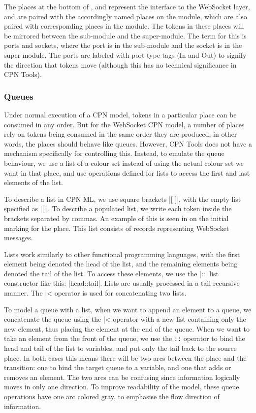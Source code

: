 	The places at the bottom of ,  and
	  represent the interface to the WebSocket layer, and
	are paired with the accordingly named places on the  module,
	which are also paired with corresponding places in the  module. The tokens in these places will be mirrored between the
	sub-module and the super-module. The term for this is ports and sockets,
	where the port is in the sub-module and the socket is in the super-module. The
	ports are labeled with port-type tags (In and Out) to signify the direction
	that tokens move (although this has no technical significance in CPN Tools).
	
	
	\subsubsection{Queues}
	
		Under normal execution of a CPN model, tokens in a particular place can be
		consumed in any order. But for the WebSocket CPN model, a number of places
		rely on tokens being consumed in the same order they are produced,
		in other words, the places should behave like queues. 
		However, CPN Tools does not have a mechanism specifically for controlling
		this.
		Instead, to emulate the queue behaviour, we use a list of a colour set
		instead of using the actual colour set we want in that place, and use
		operations defined for lists to access the first and last elements of the
		list. 
		
		To describe a list in CPN ML, we use square brackets |[ ]|, with the empty
		list specified as |[]|. To describe a populated list, we write each token
		inside the brackets separated by commas. An example of this is seen in
		 on the initial marking for the 
		place. This list consists of records representing WebSocket messages.
		
		Lists work similarly to other functional programming languages, with the
		first element being denoted the head of the list, and the remaining elements
		being denoted the tail of the list. To access these elements, we use the |::|
		list constructor like this: |head::tail|. Lists are usually processed in a
		tail-recursive manner. The |^^| operator is used for concatenating two lists.
		
		To model a queue with a list, when we want to append an
		element to a queue, we concatenate the queue using the |^^| operator with a
		new list containing only the new element, thus placing the element at the end
		of the queue. When we want to take an element from the front of the queue, we
		use the \lstinline-::- operator to bind the head and tail of the list to
		variables, and put only the tail back to the source place. In both cases this
		means there will be two arcs between the place and the transition: one to
		bind the target queue to a variable, and one that adds or removes an element.
		The two arcs can be confusing since information logically moves in only one
		direction. To improve readability of the model, these queue operations have
		one arc colored gray, to emphasise the flow direction of information.
		
